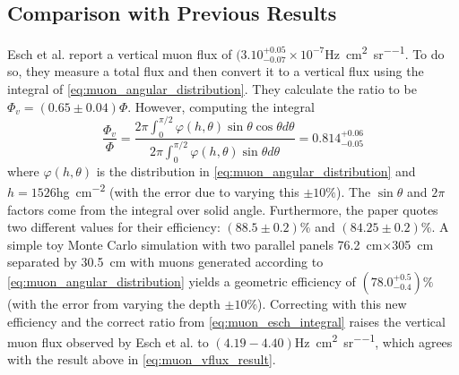 \documentclass[herrin-thesis.tex]{subfiles}
\begin{document}
\subsection{Comparison with Previous Results}
Esch et al.\cite{Esch:2004zj} report a vertical muon flux of \((3.10^{+0.05}_{-0.07}\times10^{-7}\)\si{\Hz\per\square\centi\meter\per\steradian}. To do so, they measure a total flux and then convert it to a vertical flux using the integral of \cref{eq:muon_angular_distribution}. They calculate the ratio to be \(\Phi_v = (0.65\pm0.04)\Phi\). However, computing the integral 
\begin{equation}
\label{eq:muon_esch_integral}
\frac{\Phi_v}{\Phi} = \frac{2 \pi \int_0^{\pi/2} \varphi(h,\theta)\sin\theta\cos\theta d\theta}{2 \pi \int_0^{\pi/2} \varphi(h,\theta)\sin\theta d\theta} = 0.814^{+0.06}_{-0.05}
\end{equation}
where \(\varphi(h,\theta)\) is the distribution in \cref{eq:muon_angular_distribution} and \(h = 1526\)\si{\hecto\gram\per\square\centi\meter} (with the error due to varying this \(\pm10\%\)). The \(\sin\theta\) and \(2 \pi\) factors come from the integral over solid angle. Furthermore, the paper quotes two different values for their efficiency: \((88.5\pm0.2)\%\) and \((84.25\pm0.2)\%\). A simple toy Monte Carlo simulation with two parallel panels \SI{76.2}{\cm}\(\times\)\SI{305}{\cm} separated by \SI{30.5}{cm} with muons generated according to \cref{eq:muon_angular_distribution} yields a geometric efficiency of \((78.0^{+0.5}_{-0.4})\%\) (with the error from varying the depth \(\pm10\%\)). Correcting with this new efficiency and the correct ratio from \cref{eq:muon_esch_integral} raises the vertical muon flux observed by Esch et al. to \((4.19-4.40)\)\si{\Hz\per\square\centi\meter\per\steradian}, which agrees with the result above in \cref{eq:muon_vflux_result}.

%
%
\end{document}
